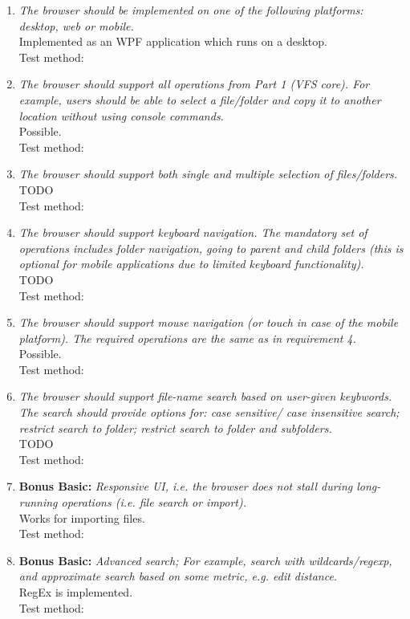 \documentclass[a4paper,12pt]{article}
\begin{document}
\begin{enumerate}
	\item \emph{The browser should be implemented on one of the following platforms: desktop, web or mobile.}\\
		Implemented as an WPF application which runs on a desktop.\\
		Test method:
	\item \emph{The browser should support all operations from Part 1 (VFS core). For example, users should be able to select a file/folder and copy it to another location without using console commands.}\\
		Possible.\\
		Test method:
	\item \emph{The browser should support both single and multiple selection of files/folders.}\\
		TODO\\
		Test method:
	\item \emph{The browser should support keyboard navigation. The mandatory set of operations includes folder navigation, going to parent and child folders (this is optional for mobile applications due to limited keyboard functionality).}\\
		TODO\\
		Test method:
	\item \emph{The browser should support mouse navigation (or touch in case of the mobile platform). The required operations are the same as in requirement 4.}\\
		Possible.\\
		Test method:
	\item \emph{The browser should support file-name search based on user-given keybwords. The search should provide options for: case sensitive/ case insensitive search; restrict search to folder; restrict search to folder and subfolders.}\\
		TODO\\
		Test method:
	\item \textbf{Bonus Basic:} \emph{Responsive UI, i.e. the browser does not stall during long-running operations (i.e. file search or import).}\\
		Works for importing files.\\
		Test method:
	\item \textbf{Bonus Basic:} \emph{Advanced search; For example, search with wildcards/regexp, and approximate search based on some metric, e.g. edit distance.}\\
		RegEx is implemented.\\
		Test method:
\end{enumerate}
\end{document}
